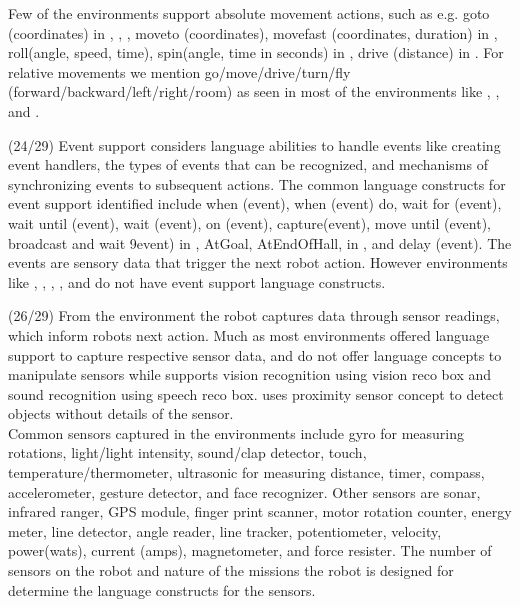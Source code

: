 Few of the environments support absolute movement actions, such as e.g. goto (coordinates) in \flyaq, \missionlab, \makeblock, moveto (coordinates), movefast (coordinates, duration) in \tivipe, roll(angle, speed, time), spin(angle, time in seconds) in \sphero, drive (distance) in \codelab. For relative movements we mention go/move/drive/turn/fly (forward/backward/left/right/room) as seen in most of the environments like \metabot, \trik, and \lego.

\parhead{\fevents} (24/29) Event support considers language abilities to handle events like creating event handlers, the types of events that can be recognized, and mechanisms of synchronizing events to subsequent actions. The common language constructs for event support identified include when (event), when (event) do, wait for (event), wait until (event), wait (event), on (event), capture(event), move until (event), broadcast and wait 9event) in \vex, AtGoal, AtEndOfHall, in \missionlab, and delay (event). The events are sensory data that trigger the next robot action. However environments like \arcbotics, \tivipe, \minibloq, \turtlebot, and \robotc do not have event support language constructs.

\parhead{\freadsensor} (26/29) From the environment the robot captures data through sensor readings, which inform robots next action. Much as most environments offered language support to capture respective sensor data, \turtlebot and \missionlab do not offer language concepts to manipulate sensors while \choregraphe supports vision recognition using vision reco box and sound recognition using speech reco box. \ozoblockly uses proximity sensor concept to detect objects without details of the sensor.\\

Common sensors captured in the environments include gyro for measuring rotations, light/light intensity, sound/clap detector, touch, temperature/thermometer, ultrasonic for measuring distance, timer, compass, accelerometer, gesture detector, and face recognizer. Other sensors are sonar, infrared ranger, GPS module, finger print scanner, motor rotation counter, energy meter, line detector, angle reader, line tracker, potentiometer, velocity, power(wats), current (amps), magnetometer, and force resister. The number of sensors on the robot and nature of the missions the robot is designed for determine the language constructs for the sensors.  \\

